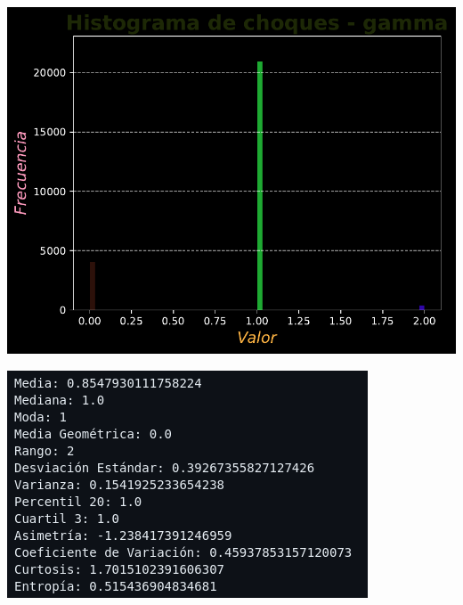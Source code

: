 \documentclass[11pt]{article} %
\begin{document}
	\begin{multicols}{2}
		\begin{minipage}{\linewidth}
			\centering
			\includegraphics[width=1\linewidth]{hist_choques_gamma.pdf}
			\label{fig:chGammaHist}
		\end{minipage}
		\vfill\columnbreak
		\begin{minipage}{\linewidth}
			\centering
			\includegraphics[width=1\linewidth]{g4.png}%
			\label{chGammaMet}
		\end{minipage}
	\end{multicols}
\end{document}
